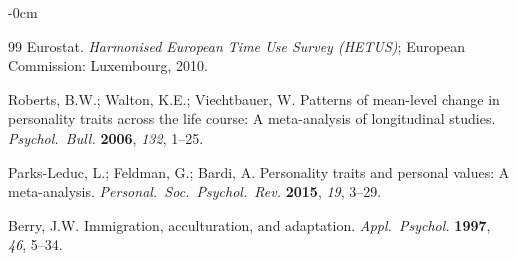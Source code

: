 \documentclass[sustainability,article,submit,pdftex,moreauthors]{Definitions/mdpi}
\begin{document}
\begin{adjustwidth}{-\extralength}{0cm}
\begin{thebibliography}{99}
Eurostat. \textit{Harmonised European Time Use Survey (HETUS)};
European Commission: Luxembourg, 2010.

Roberts, B.W.; Walton, K.E.; Viechtbauer, W. Patterns of mean-level change
in personality traits across the life course: A meta-analysis of longitudinal
studies.
\textit{Psychol.\ Bull.} \textbf{2006}, \textit{132}, 1--25.

Parks-Leduc, L.; Feldman, G.; Bardi, A. Personality traits and personal values:
A meta-analysis.
\textit{Personal.\ Soc.\ Psychol.\ Rev.} \textbf{2015}, \textit{19}, 3--29.

Berry, J.W. Immigration, acculturation, and adaptation.
\textit{Appl.\ Psychol.} \textbf{1997}, \textit{46}, 5--34.

\end{thebibliography}

\PublishersNote{}
\end{adjustwidth}
\end{document}
